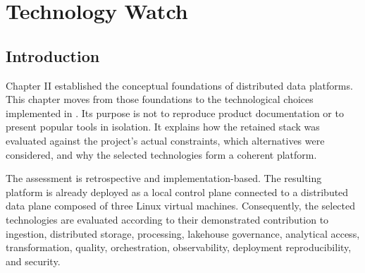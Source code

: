 \chapter{Technology Watch}

\section{Introduction}
Chapter II established the conceptual foundations of distributed data platforms. This chapter moves from those foundations to the technological choices implemented in \projectname{}. Its purpose is not to reproduce product documentation or to present popular tools in isolation. It explains how the retained stack was evaluated against the project's actual constraints, which alternatives were considered, and why the selected technologies form a coherent platform.

The assessment is retrospective and implementation-based. The resulting platform is already deployed as a local control plane connected to a distributed data plane composed of three Linux virtual machines. Consequently, the selected technologies are evaluated according to their demonstrated contribution to ingestion, distributed storage, processing, lakehouse governance, analytical access, transformation, quality, orchestration, observability, deployment reproducibility, and security.

